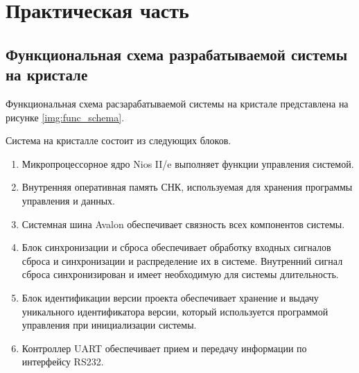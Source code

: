 \chapter*{\textbf{Практическая часть}}

\section*{\textbf{Функциональная схема разрабатываемой системы на кристале}}

Функциональная схема расзарабатываемой системы на кристале представлена на рисунке \ref{img:func_schema}.

\begin{figure}[H]
	\captionsetup{justification=centering}
\end{figure}

Система на кристалле состоит из следующих блоков.

\begin{enumerate}
	\item Микропроцессорное ядро Nios II/e выполняет функции управления
	системой.
	\item Внутренняя оперативная память СНК, используемая для хранения программы
	управления и данных. 
	\item Системная шина Avalon обеспечивает связность всех компонентов системы.
	\item Блок синхронизации и сброса обеспечивает обработку входных сигналов сброса и
	синхронизации и распределение их в системе. Внутренний сигнал сброса
	синхронизирован и имеет необходимую для системы длительность.
	\item Блок идентификации версии проекта обеспечивает хранение и выдачу уникального идентификатора версии, который используется программой управления при инициализации системы.
	\item Контроллер UART обеспечивает прием и передачу информации по
	интерфейсу RS232.
\end{enumerate}
\clearpage

